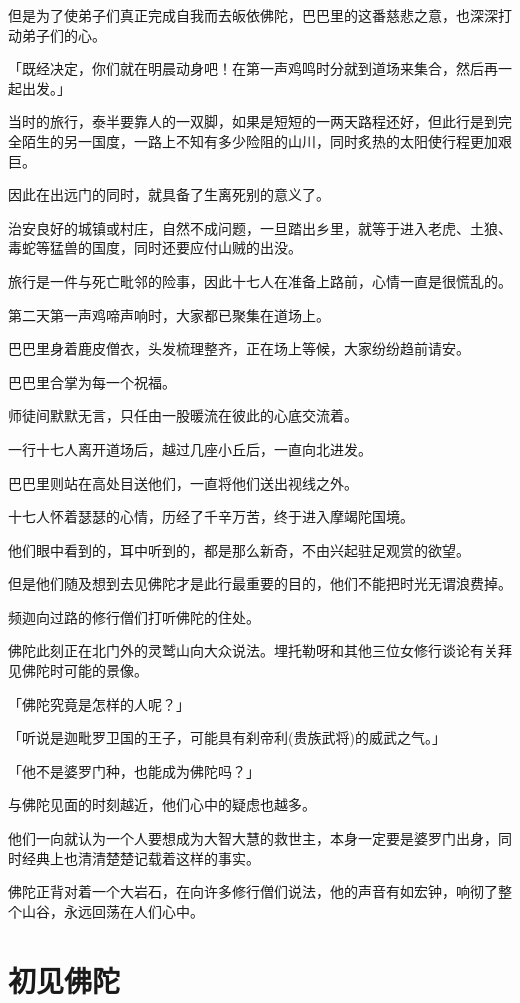 \documentclass[twoside,openany]{book}
\begin{document}
但是为了使弟子们真正完成自我而去皈依佛陀，巴巴里的这番慈悲之意，也深深打动弟子们的心。

「既经决定，你们就在明晨动身吧！在第一声鸡鸣时分就到道场来集合，然后再一起出发。」

当时的旅行，泰半要靠人的一双脚，如果是短短的一两天路程还好，但此行是到完全陌生的另一国度，一路上不知有多少险阻的山川，同时炙热的太阳使行程更加艰巨。

因此在出远门的同时，就具备了生离死别的意义了。

治安良好的城镇或村庄，自然不成问题，一旦踏出乡里，就等于进入老虎、土狼、毒蛇等猛兽的国度，同时还要应付山贼的出没。

旅行是一件与死亡毗邻的险事，因此十七人在准备上路前，心情一直是很慌乱的。

第二天第一声鸡啼声响时，大家都已聚集在道场上。

巴巴里身着鹿皮僧衣，头发梳理整齐，正在场上等候，大家纷纷趋前请安。

巴巴里合掌为每一个祝福。

师徒间默默无言，只任由一股暖流在彼此的心底交流着。

一行十七人离开道场后，越过几座小丘后，一直向北进发。

巴巴里则站在高处目送他们，一直将他们送出视线之外。

十七人怀着瑟瑟的心情，历经了千辛万苦，终于进入摩竭陀国境。

他们眼中看到的，耳中听到的，都是那么新奇，不由兴起驻足观赏的欲望。

但是他们随及想到去见佛陀才是此行最重要的目的，他们不能把时光无谓浪费掉。

频迦向过路的修行僧们打听佛陀的住处。

佛陀此刻正在北门外的灵鹫山向大众说法。埋托勒呀和其他三位女修行谈论有关拜见佛陀时可能的景像。

「佛陀究竟是怎样的人呢？」

「听说是迦毗罗卫国的王子，可能具有刹帝利(贵族武将)的威武之气。」

「他不是婆罗门种，也能成为佛陀吗？」

与佛陀见面的时刻越近，他们心中的疑虑也越多。

他们一向就认为一个人要想成为大智大慧的救世主，本身一定要是婆罗门出身，同时经典上也清清楚楚记载着这样的事实。

佛陀正背对着一个大岩石，在向许多修行僧们说法，他的声音有如宏钟，响彻了整个山谷，永远回荡在人们心中。

\section{初见佛陀}\label{sec5.2}
\end{document}

